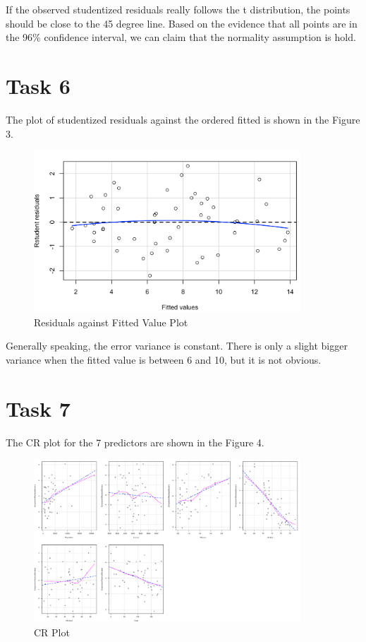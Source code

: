 \documentclass[doc,biblatex,apacite]{apa6}
\begin{document}
If the observed studentized residuals really follows the t distribution, the points should be close to the 45 degree line.
Based on the evidence that all points are in the 96\% confidence interval, we can claim that the normality assumption is hold.


\section{Task 6}
The plot of studentized residuals against the ordered fitted is shown in the Figure 3.

\begin{figure}
    \centering
    \includegraphics[width=10cm]{residual_plot.png}
    \caption{Residuals against Fitted Value Plot}
\end{figure}

Generally speaking, the error variance is constant. 
There is only a slight bigger variance when the fitted value is
between 6 and 10, but it is not obvious.

\section{Task 7}
The CR plot for the 7 predictors are shown in the Figure 4.
\begin{figure}
    \centering
    \includegraphics[width=10cm]{CRPLot.png}
    \caption{CR Plot}
\end{figure}
\end{document}
